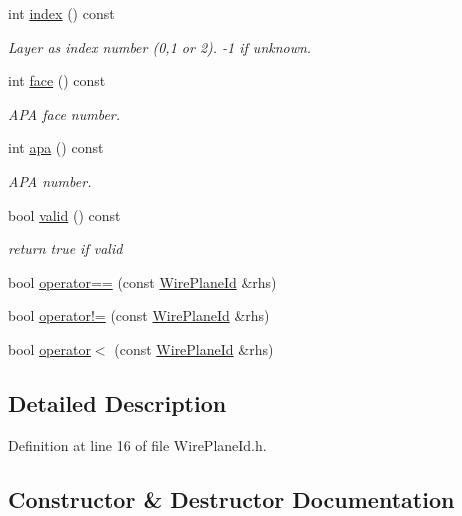 \begin{DoxyCompactItemize}
int \hyperlink{class_wire_cell_1_1_wire_plane_id_a72e32df6a0f0721dba0f1c5c76649c9a}{index} () const
\begin{DoxyCompactList}\small\item\em Layer as index number (0,1 or 2). -\/1 if unknown. \end{DoxyCompactList}\item 
int \hyperlink{class_wire_cell_1_1_wire_plane_id_a18de55bd3637c1586db6ab9e5f39da18}{face} () const
\begin{DoxyCompactList}\small\item\em A\+PA face number. \end{DoxyCompactList}\item 
int \hyperlink{class_wire_cell_1_1_wire_plane_id_a868dff2296e2531a30732a0528054be2}{apa} () const
\begin{DoxyCompactList}\small\item\em A\+PA number. \end{DoxyCompactList}\item 
bool \hyperlink{class_wire_cell_1_1_wire_plane_id_a617a3b37d14485b685db0762be14bec4}{valid} () const
\begin{DoxyCompactList}\small\item\em return true if valid \end{DoxyCompactList}\item 
bool \hyperlink{class_wire_cell_1_1_wire_plane_id_a90632df3b572a85909d3ab17eb9bb4d4}{operator==} (const \hyperlink{class_wire_cell_1_1_wire_plane_id}{Wire\+Plane\+Id} \&rhs)
\item 
bool \hyperlink{class_wire_cell_1_1_wire_plane_id_abdf61c8300e6e748240da00871108471}{operator!=} (const \hyperlink{class_wire_cell_1_1_wire_plane_id}{Wire\+Plane\+Id} \&rhs)
\item 
bool \hyperlink{class_wire_cell_1_1_wire_plane_id_addc8729f389598caf82777cf5cddb30a}{operator$<$} (const \hyperlink{class_wire_cell_1_1_wire_plane_id}{Wire\+Plane\+Id} \&rhs)
\end{DoxyCompactItemize}


\subsection{Detailed Description}


Definition at line 16 of file Wire\+Plane\+Id.\+h.



\subsection{Constructor \& Destructor Documentation}
\mbox{\label{class_wire_cell_1_1_wire_plane_id_ad98e6c304a687aea61232e5c6c108ba9}} 
